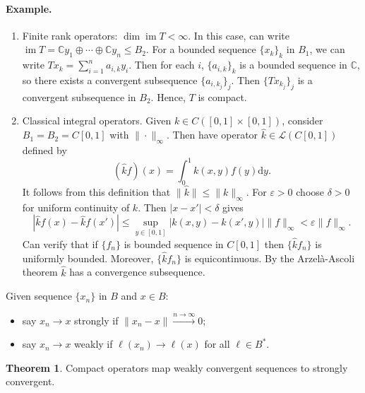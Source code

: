 \documentclass[12pt]{article}
\theoremstyle{definition}
\newtheorem{theorem}{Theorem}
\newcommand{\C}{\mathbb{C}}
\newcommand{\LL}{\mathcal{L}}
\newcommand{\eps}{\varepsilon}
\newcommand{\<}{\left\langle}
\renewcommand{\>}{\right\rangle}
\newcommand{\dd}{\mathrm{d}}
\DeclareMathOperator{\im}{im}
\begin{document}
\paragraph{Example.}
\begin{enumerate}
    \item Finite rank operators: $\dim\im T < \infty$.
    In this case, can write $\im T = \C y_1 \oplus \cdots \oplus \C y_n \leq B_2$.
    For a bounded sequence $\{x_k\}_k$ in $B_1$, we can write
    $Tx_k = \sum_{i=1}^{n} a_{i,k} y_i$.
    Then for each $i$, $\{a_{i,k}\}_k$ is a bounded sequence in $\C$, so there exists a convergent subsequence $\{a_{i,k_j}\}_j$.
    Then $\{Tx_{k_j}\}_j$ is a convergent subsequence in $B_2$.
    Hence, $T$ is compact.
    \item Classical integral operators.
    Given $k \in C([0, 1] \times [0, 1])$, consider $B_1 = B_2 = C[0, 1]$ with $\|\cdot\|_\infty$.
    Then have operator $\hat{k} \in \LL(C[0, 1])$ defined by
    \[
        (\hat{k}f)(x) = \int_{0}^{1} k(x, y) f(y) \dd{y}.
    \]
    It follows from this definition that $\|\hat{k}\| \leq \|k\|_\infty$.
    For $\eps > 0$ choose $\delta > 0$ for uniform continuity of $k$.
    Then $|x - x'| < \delta$ gives
    \[
        \left|\hat{k}f(x) - \hat{k}f(x')\right|
            \leq \sup_{y \in [0, 1]} \left|k(x, y) - k(x', y)\right|\|f\|_\infty
            < \eps\|f\|_\infty.
    \]
    Can verify that if $\{f_n\}$ is bounded sequence in $C[0, 1]$ then $\{\hat{k}f_n\}$ is uniformly bounded.
    Moreover, $\{\hat{k}f_n\}$ is equicontinuous.
    By the Arzel\`a-Ascoli theorem $\hat{k}$ has a convergence subsequence.
\end{enumerate}

Given sequence $\{x_n\}$ in $B$ and $x \in B$:
\begin{itemize}[nosep]
    \item say $x_n \to x$ strongly if $\|x_n - x\| \xrightarrow{n \to \infty} 0$;
    \item say $x_n \to x$ weakly if $\ell(x_n) \to \ell(x)$ for all $\ell \in B^*$.
\end{itemize}

\begin{theorem}
    Compact operators map weakly convergent sequences to strongly convergent.
\end{theorem}
\end{document}
